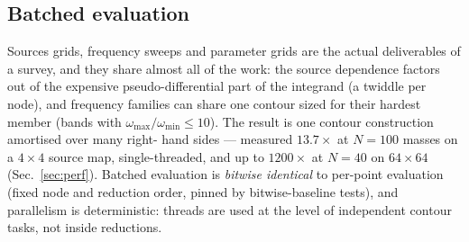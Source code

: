 \documentclass[11pt,a4paper]{article}
\begin{document}
\subsection{Batched evaluation}
Sources grids, frequency sweeps and parameter grids are the actual
deliverables of a survey, and they share almost all of the work: the source
dependence factors out of the expensive pseudo-differential part of the
integrand (a twiddle per node), and frequency families can share one contour
sized for their hardest member (bands with $\omega_{\max}/\omega_{\min}
\le 10$).  The result is one contour construction amortised over many right-
hand sides --- measured $13.7\times$ at $N=100$ masses on a $4\times4$
source map, single-threaded, and up to $1200\times$ at $N=40$ on
$64\times64$ (Sec.~\ref{sec:perf}).  Batched evaluation is \emph{bitwise identical}
to per-point evaluation (fixed node and reduction order, pinned by
bitwise-baseline tests), and parallelism is deterministic: threads are used
at the level of independent contour tasks, not inside reductions.
\end{document}
